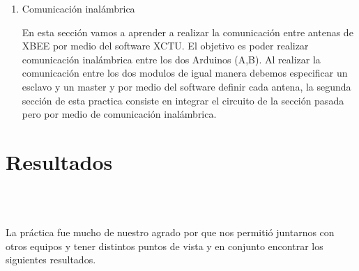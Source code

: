 \documentclass[conference]{IEEEtran}
\begin{document}
\begin{enumerate}
    \item Comunicación inalámbrica\\
    
    \par En esta sección vamos a aprender a realizar la comunicación entre antenas de XBEE por medio del software XCTU. El objetivo es poder realizar comunicación inalámbrica entre los dos Arduinos (A,B). Al realizar la comunicación entre los dos modulos de igual manera debemos especificar un esclavo y un master y por medio del software definir cada antena, la segunda sección de esta practica consiste en integrar el circuito de la sección pasada pero por medio de comunicación inalámbrica. 
\end{enumerate}

\section{Resultados}\\\\

\par La práctica fue mucho de nuestro agrado por que nos permitió juntarnos con otros equipos y tener distintos puntos de vista y en conjunto encontrar los siguientes resultados.\\
\end{document}

